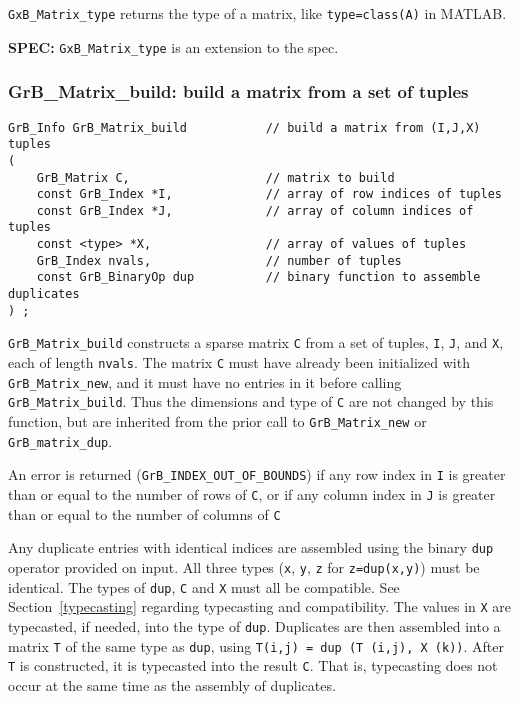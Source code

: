 \documentclass[12pt]{article}
\begin{document}
\verb'GxB_Matrix_type' returns the type of a matrix, like \verb'type=class(A)'
in MATLAB.

\begin{spec}
{\bf SPEC:} \verb'GxB_Matrix_type' is an extension to the spec.
\end{spec}

\newpage
\subsubsection{{\sf GrB\_Matrix\_build:} build a matrix from a set of tuples}
\label{matrix_build}

\begin{mdframed}[userdefinedwidth=6in]
{\footnotesize
\begin{verbatim}
GrB_Info GrB_Matrix_build           // build a matrix from (I,J,X) tuples
(
    GrB_Matrix C,                   // matrix to build
    const GrB_Index *I,             // array of row indices of tuples
    const GrB_Index *J,             // array of column indices of tuples
    const <type> *X,                // array of values of tuples
    GrB_Index nvals,                // number of tuples
    const GrB_BinaryOp dup          // binary function to assemble duplicates
) ;
\end{verbatim} } \end{mdframed}

\verb'GrB_Matrix_build' constructs a sparse matrix \verb'C' from a set of
tuples, \verb'I', \verb'J', and \verb'X', each of length \verb'nvals'.  The
matrix \verb'C' must have already been initialized with \verb'GrB_Matrix_new',
and it must have no entries in it before calling \verb'GrB_Matrix_build'.  Thus
the dimensions and type of \verb'C' are not changed by this function, but are
inherited from the prior call to \verb'GrB_Matrix_new' or
\verb'GrB_matrix_dup'.

An error is returned (\verb'GrB_INDEX_OUT_OF_BOUNDS') if any row index in
\verb'I' is greater than or equal to the number of rows of \verb'C', or if any
column index in \verb'J' is greater than or equal to the number of columns of
\verb'C'

Any duplicate entries with identical indices are assembled using the binary
\verb'dup' operator provided on input.  All three types (\verb'x', \verb'y',
\verb'z' for \verb'z=dup(x,y)') must be identical.  The types of \verb'dup',
\verb'C' and \verb'X' must all be compatible.  See Section~\ref{typecasting}
regarding typecasting and compatibility.  The values in \verb'X' are
typecasted, if needed, into the type of \verb'dup'.  Duplicates are then
assembled into a matrix \verb'T' of the same type as \verb'dup', using
\verb'T(i,j) = dup (T (i,j), X (k))'.  After \verb'T' is constructed, it is
typecasted into the result \verb'C'.  That is, typecasting does not occur at
the same time as the assembly of duplicates.
\end{document}
